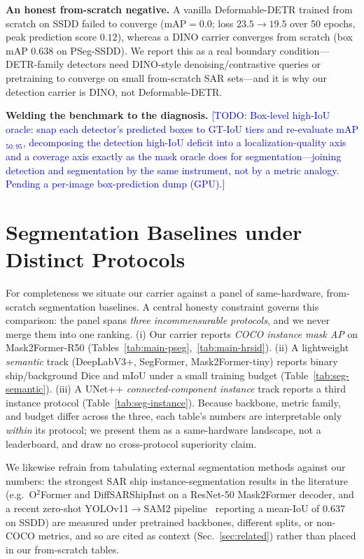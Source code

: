 \documentclass[journal]{IEEEtran}
\newcommand{\TODO}[1]{\textcolor{blue}{[TODO: #1]}}
\begin{document}
\textbf{An honest from-scratch negative.} A vanilla Deformable-DETR trained from scratch on SSDD failed to converge (mAP$=0.0$; loss $23.5\!\to\!19.5$ over 50 epochs, peak prediction score $0.12$), whereas a DINO carrier converges from scratch (box mAP $0.638$ on PSeg-SSDD). We report this as a real boundary condition---DETR-family detectors need DINO-style denoising/contrastive queries or pretraining to converge on small from-scratch SAR sets---and it is why our detection carrier is DINO, not Deformable-DETR.

\textbf{Welding the benchmark to the diagnosis.} \TODO{Box-level high-IoU oracle: snap each detector's predicted boxes to GT-IoU tiers and re-evaluate mAP$_{50:95}$, decomposing the detection high-IoU deficit into a localization-quality axis and a coverage axis exactly as the mask oracle does for segmentation---joining detection and segmentation by the same instrument, not by a metric analogy. Pending a per-image box-prediction dump (GPU).}

\section{Segmentation Baselines under Distinct Protocols}
\label{sec:segbaselines}
For completeness we situate our carrier against a panel of same-hardware, from-scratch segmentation baselines. A central honesty constraint governs this comparison: the panel spans \emph{three incommensurable protocols}, and we never merge them into one ranking. (i) Our carrier reports \emph{COCO instance mask AP} on Mask2Former-R50 (Tables~\ref{tab:main-pseg},~\ref{tab:main-hrsid}). (ii) A lightweight \emph{semantic} track (DeepLabV3+, SegFormer, Mask2Former-tiny) reports binary ship/background Dice and mIoU under a small training budget (Table~\ref{tab:seg-semantic}). (iii) A UNet++ \emph{connected-component instance} track reports a third instance protocol (Table~\ref{tab:seg-instance}). Because backbone, metric family, and budget differ across the three, each table's numbers are interpretable only \emph{within} its protocol; we present them as a same-hardware landscape, not a leaderboard, and draw no cross-protocol superiority claim.



We likewise refrain from tabulating external segmentation methods against our numbers: the strongest SAR ship instance-segmentation results in the literature (e.g.\ O$^2$Former and DiffSARShipInst on a ResNet-50 Mask2Former decoder, and a recent zero-shot YOLOv11$\to$SAM2 pipeline~\cite{mansour2026zeroshot} reporting a mean-IoU of $0.637$ on SSDD) are measured under pretrained backbones, different splits, or non-COCO metrics, and so are cited as context (Sec.~\ref{sec:related}) rather than placed in our from-scratch tables.
\end{document}
